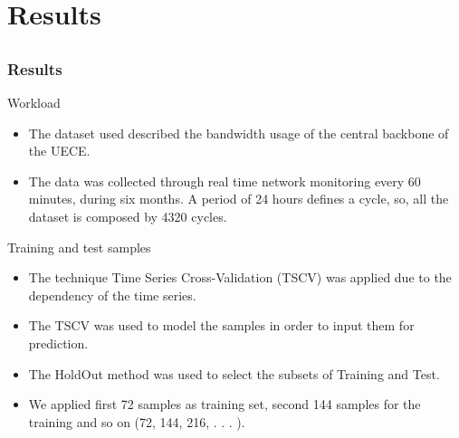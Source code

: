 \documentclass[aspectratio=169]{beamer}
\begin{document}

\section{Results}


\subsection{}
\begin{frame}
\frametitle{Results}
\small
\begin{block}{Workload}
\begin{itemize} \small
    \item The dataset used described the bandwidth usage of the central backbone of the UECE.
    \item The data was collected through real time network monitoring every 60 minutes, during six months. A period of 24 hours defines a cycle, so, all the dataset is composed by 4320 cycles.
\end{itemize}
\end{block}

\begin{block}{Training and test samples}
\begin{itemize} \small
    \item The technique Time Series Cross-Validation (TSCV) was applied due to the dependency of the time series.
    \item The TSCV was used to model the samples in order to input them for prediction.
    \item The HoldOut method was used to select the subsets of Training and Test.
    \item We applied first 72 samples as training set, second 144 samples for the training and so on (72, 144, 216, . . . ).
\end{itemize}
\end{block}
\end{frame}

\end{document}
